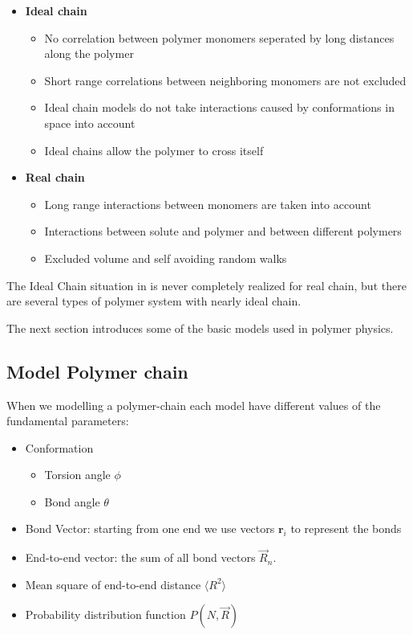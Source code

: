 \begin{itemize}
    \item \textbf{Ideal chain} 
        \begin{itemize}
            \item No correlation between polymer monomers seperated by long
distances along the polymer
            \item Short range correlations between neighboring monomers are not excluded
            \item Ideal chain models do not take interactions caused by
conformations in space into account
            \item Ideal chains allow the polymer to cross itself
        
        \end{itemize}
    \item \textbf{Real chain} 
        \begin{itemize}
            \item Long range interactions between monomers are taken into account
            \item Interactions between solute and polymer and between different polymers
            \item Excluded volume and self avoiding random walks
        
        \end{itemize}

\end{itemize}
The Ideal Chain situation in  is never completely realized for real chain, but there are several types of polymer system with nearly ideal chain.

The next section introduces some of the basic models used in polymer physics.

\subsection{Model Polymer chain}

When we modelling a polymer-chain each model have different values of the fundamental parameters:

\begin{itemize}
\item Conformation 
  \begin{itemize}  
    \item Torsion angle $\phi$
    \item Bond angle $\theta$
  \end{itemize}  
 \item Bond Vector: starting from one end we use vectors $\mathbf{r}_i$ to represent the bonds 
  \item End-to-end vector: the sum of all bond vectors $\vec{R}_n$.
  \item Mean square of end-to-end distance $\big \langle R^2 \big \rangle $ 
  \item Probability distribution function $P(N,\vec{R})$
\end{itemize}



